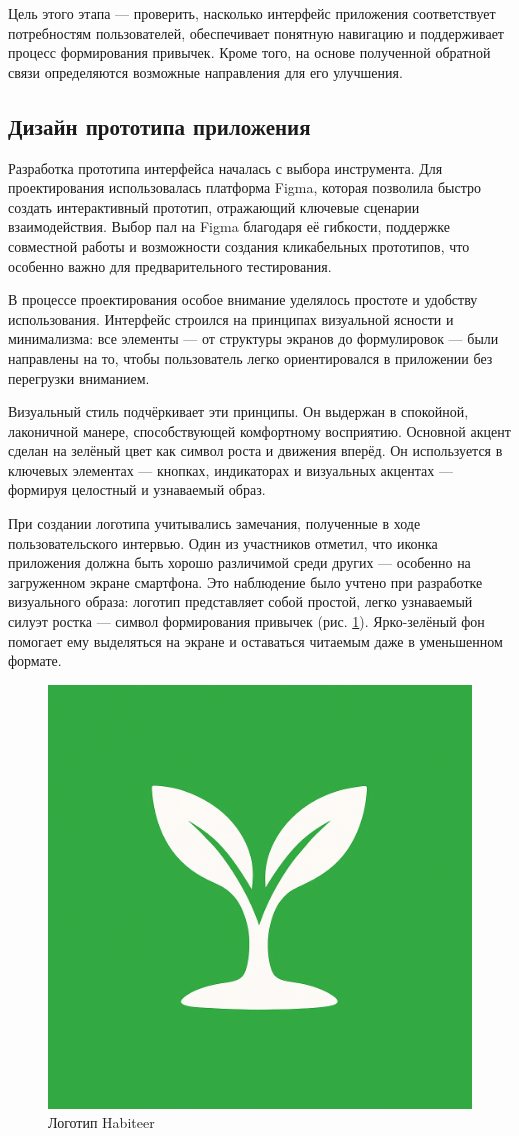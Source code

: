 \documentclass[pdflatex,sn-mathphys-num]{sn-jnl}%
\theoremstyle{thmstyleone}%
\theoremstyle{thmstyletwo}%
\theoremstyle{thmstylethree}%
\begin{document}
Цель этого этапа — проверить, насколько интерфейс приложения соответствует потребностям пользователей, обеспечивает понятную навигацию и поддерживает процесс формирования привычек. Кроме того, на основе полученной обратной связи определяются возможные направления для его улучшения.

\subsection{Дизайн прототипа приложения}

Разработка прототипа интерфейса началась с выбора инструмента. Для проектирования использовалась платформа Figma, которая позволила быстро создать интерактивный прототип, отражающий ключевые сценарии взаимодействия. Выбор пал на Figma благодаря её гибкости, поддержке совместной работы и возможности создания кликабельных прототипов, что особенно важно для предварительного тестирования.

В процессе проектирования особое внимание уделялось простоте и удобству использования. Интерфейс строился на принципах визуальной ясности и минимализма: все элементы — от структуры экранов до формулировок — были направлены на то, чтобы пользователь легко ориентировался в приложении без перегрузки вниманием.

Визуальный стиль подчёркивает эти принципы. Он выдержан в спокойной, лаконичной манере, способствующей комфортному восприятию. Основной акцент сделан на зелёный цвет как символ роста и движения вперёд. Он используется в ключевых элементах — кнопках, индикаторах и визуальных акцентах — формируя целостный и узнаваемый образ.

При создании логотипа учитывались замечания, полученные в ходе пользовательского интервью. Один из участников отметил, что иконка приложения должна быть хорошо различимой среди других — особенно на загруженном экране смартфона. Это наблюдение было учтено при разработке визуального образа: логотип представляет собой простой, легко узнаваемый силуэт ростка — символ формирования привычек (рис. \ref{fig:Habiteer_icon}). Ярко-зелёный фон помогает ему выделяться на экране и оставаться читаемым даже в уменьшенном формате.

\begin{figure}
    \centering
    \includegraphics[width=0.25\linewidth]{figures/App/Habiteer_icon.png}
    \caption{Логотип Habiteer}
    \label{fig:Habiteer_icon}
\end{figure}
\end{document}

